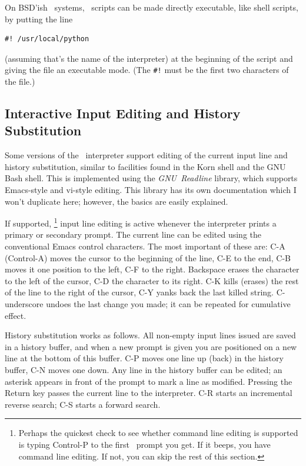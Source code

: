 On BSD'ish \UNIX\ systems, \Python\ scripts can be made directly executable,
like shell scripts, by putting the line
\bcode\begin{verbatim}
#! /usr/local/python
\end{verbatim}\ecode
(assuming that's the name of the interpreter) at the beginning of the
script and giving the file an executable mode.
(The
{\tt \#!}
must be the first two characters of the file.)

\subsection{Interactive Input Editing and History Substitution}

Some versions of the \Python\ interpreter support editing of the current
input line and history substitution, similar to facilities found in the
Korn shell and the GNU Bash shell.
This is implemented using the
{\em GNU\ Readline}
library, which supports Emacs-style and vi-style editing.
This library has its own documentation which I won't duplicate here;
however, the basics are easily explained.

If supported,%
\footnote{
	Perhaps the quickest check to see whether command line editing
	is supported is typing Control-P to the first \Python\ prompt
	you get.  If it beeps, you have command line editing.
	If not, you can skip the rest of this section.
}
input line editing is active whenever the interpreter prints a primary
or secondary prompt.
The current line can be edited using the conventional Emacs control
characters.
The most important of these are:
C-A (Control-A) moves the cursor to the beginning of the line, C-E to
the end, C-B moves it one position to the left, C-F to the right.
Backspace erases the character to the left of the cursor, C-D the
character to its right.
C-K kills (erases) the rest of the line to the right of the cursor, C-Y
yanks back the last killed string.
C-underscore undoes the last change you made; it can be repeated for
cumulative effect.

History substitution works as follows.
All non-empty input lines issued are saved in a history buffer,
and when a new prompt is given you are positioned on a new line at the
bottom of this buffer.
C-P moves one line up (back) in the history buffer, C-N moves one down.
Any line in the history buffer can be edited; an asterisk appears in
front of the prompt to mark a line as modified.
Pressing the Return key passes the current line to the interpreter.
C-R starts an incremental reverse search; C-S starts a forward search.


